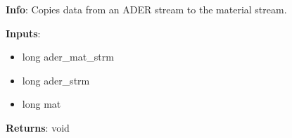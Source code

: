 \textbf{Info}: Copies data from an ADER stream to the material stream. 

\noindent \textbf{Inputs}:
\begin{itemize}
\item{long ader\_mat\_strm}
\item{long ader\_strm}
\item{long mat}
\end{itemize}

\noindent \textbf{Returns}: void
